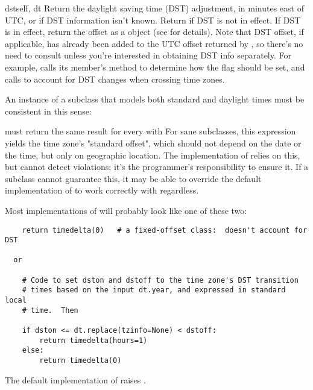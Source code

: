 \begin{methoddesc}{dst}{self, dt}
  Return the daylight saving time (DST) adjustment, in minutes east of
  UTC, or  if DST information isn't known.  Return
   if DST is not in effect.
  If DST is in effect, return the offset as a
   object (see  for details).
  Note that DST offset, if applicable, has
  already been added to the UTC offset returned by
  , so there's no need to consult 
  unless you're interested in obtaining DST info separately.  For
  example,  calls its 
  member's  method to determine how the
   flag should be set, and
   calls  to account for
  DST changes when crossing time zones.

  An instance  of a  subclass that models both
  standard and daylight times must be consistent in this sense:


  must return the same result for every  
  with   For sane 
  subclasses, this expression yields the time zone's "standard offset",
  which should not depend on the date or the time, but only on geographic
  location.  The implementation of  relies
  on this, but cannot detect violations; it's the programmer's
  responsibility to ensure it.  If a  subclass cannot
  guarantee this, it may be able to override the default implementation
  of  to work correctly with 
  regardless.

  Most implementations of  will probably look like one
  of these two:

\begin{verbatim}
    return timedelta(0)   # a fixed-offset class:  doesn't account for DST

  or

    # Code to set dston and dstoff to the time zone's DST transition
    # times based on the input dt.year, and expressed in standard local
    # time.  Then

    if dston <= dt.replace(tzinfo=None) < dstoff:
        return timedelta(hours=1)
    else:
        return timedelta(0)
\end{verbatim}

  The default implementation of  raises
  .
\end{methoddesc}

